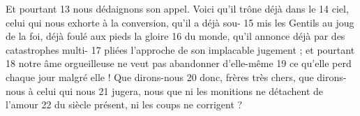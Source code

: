 Et pourtant	 
13	 	nous dédaignons son appel. Voici qu'il trône déjà dans le	 
14	 	ciel, celui qui nous exhorte à la conversion, qu'il a déjà sou-	 
15	 	mis les Gentils au joug de la foi, déjà foulé aux pieds la gloire	 
16	 	du monde, qu'il annonce déjà par des catastrophes multi-	 
17	 	pliées l'approche de son implacable jugement ; et pourtant	 
18	 	notre âme orgueilleuse ne veut pas abandonner d'elle-même	 
19	 	ce qu'elle perd chaque jour malgré elle ! Que dirons-nous	 
20	 	donc, frères très chers, que dirons-nous à celui qui nous	 
21	 	jugera, nous que ni les monitions ne détachent de l'amour	 
22	 	du siècle présent, ni les coups ne corrigent ?